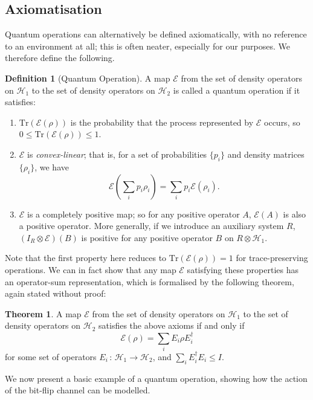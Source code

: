 \documentclass[12pt,a4paper]{report}
\numberwithin{equation}{section}
\newcommand{\tr}{\text{Tr}}
\theoremstyle{definition}
\newtheorem{definition}{Definition}[section]
\theoremstyle{theorem}
\newtheorem{theorem}{Theorem}[section]
\theoremstyle{theorem}
\theoremstyle{example}
\theoremstyle{definition}
\begin{document}
\subsection{Axiomatisation}
Quantum operations can alternatively be defined axiomatically, with no reference to an environment at all; this is often neater, especially for our purposes. We therefore define the following.
\begin{definition}[Quantum Operation]
	A map $\mathcal{E}$ from the set of density operators on $\mathcal{H}_{1}$ to the set of density operators on $\mathcal{H}_{2}$ is called a quantum operation if it satisfies:
	\begin{enumerate}
		\item $\text{Tr}(\mathcal{E}(\rho))$ is the probability that the process represented by $\mathcal{E}$ occurs, so $0\leq\text{Tr}(\mathcal{E}(\rho))\leq 1$.
		\item $\mathcal{E}$ is \textit{convex-linear}; that is, for a set of probabilities $\{p_{i}\}$ and density matrices $\{\rho_{i}\}$, we have
		\begin{equation}
			\mathcal{E}\left(\sum_{i}p_{i}\rho_{i}\right)=\sum_{i}p_{i}\mathcal{E}(\rho_{i}).
		\end{equation}
		\item $\mathcal{E}$ is a completely positive map; so for any positive operator $A$, $\mathcal{E}(A)$ is also a positive operator. More generally, if we introduce an auxiliary system $R$, $(I_{R}\otimes \mathcal{E})(B)$ is positive for any positive operator $B$ on $R\otimes\mathcal{H}_{1}$.
	\end{enumerate} 
\end{definition}
Note that the first property here reduces to $\tr(\mathcal{E}(\rho))=1$ for trace-preserving operations. We can in fact show that any map $\mathcal{E}$ satisfying these properties has an operator-sum representation, which is formalised by the following theorem, again stated without proof:
\begin{theorem}
	A map $\mathcal{E}$ from the set of density operators on $\mathcal{H}_{1}$ to the set of density operators on $\mathcal{H}_{2}$ satisfies the above axioms if and only if
	\begin{equation}
		\mathcal{E}(\rho)=\sum_{i}E_{i}\rho E_{i}^{\dagger}
	\end{equation}
	for some set of operators $E_{i}\,:\,\mathcal{H}_{1}\to\mathcal{H}_{2}$, and $\sum_{i}E_{i}^{\dagger}E_{i}\leq I$.
\end{theorem}
We now present a basic example of a quantum operation, showing how the action of the bit-flip channel can be modelled.
\end{document}

